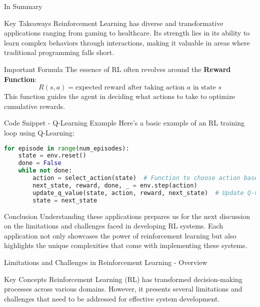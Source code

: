 \documentclass[aspectratio=169]{beamer}
\begin{document}
\begin{frame}{In Summary}
    \begin{block}{Key Takeaways}
        Reinforcement Learning has diverse and transformative applications ranging from gaming to healthcare. Its strength lies in its ability to learn complex behaviors through interactions, making it valuable in areas where traditional programming falls short.
    \end{block}
\end{frame}

\begin{frame}{Important Formula}
    The essence of RL often revolves around the \textbf{Reward Function}:
    \begin{equation}
        R(s, a) = \text{expected reward after taking action } a \text{ in state } s
    \end{equation}
    This function guides the agent in deciding what actions to take to optimize cumulative rewards.
\end{frame}

\begin{frame}[fragile]{Code Snippet - Q-Learning Example}
    Here’s a basic example of an RL training loop using Q-Learning:
    \begin{lstlisting}[language=Python]
for episode in range(num_episodes):
    state = env.reset()
    done = False
    while not done:
        action = select_action(state)  # Function to choose action based on policy
        next_state, reward, done, _ = env.step(action)
        update_q_value(state, action, reward, next_state)  # Update Q-value based on observed reward
        state = next_state
    \end{lstlisting}
\end{frame}

\begin{frame}{Conclusion}
    Understanding these applications prepares us for the next discussion on the limitations and challenges faced in developing RL systems. Each application not only showcases the power of reinforcement learning but also highlights the unique complexities that come with implementing these systems.
\end{frame}

\begin{frame}[fragile]{Limitations and Challenges in Reinforcement Learning - Overview}
    \begin{block}{Key Concepts}
        Reinforcement Learning (RL) has transformed decision-making processes across various domains. However, it presents several limitations and challenges that need to be addressed for effective system development.
    \end{block}
\end{frame}
\end{document}
